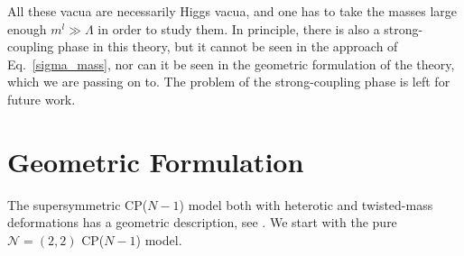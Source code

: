 \documentclass[12pt]{article}
\newcommand{\ntwot}{${\mathcal N}= \left(2,2\right) $ }
\begin{document}
	All these vacua are necessarily Higgs vacua, and one has to take the masses large enough
	$ m^l \gg \Lambda $ in order to study them.
	In principle, there is also a strong-coupling phase in this theory, but it cannot
	be seen in the approach of Eq.~\eqref{sigma_mass}, nor can it be seen in the geometric formulation
	of the theory, which we are passing on to.	
	The problem of the strong-coupling phase is left for future work.


%
%
\section{Geometric Formulation}
\label{geomf}	
	
	The supersymmetric CP($N-1$) model both with heterotic and twisted-mass deformations has
	a geometric description, see \cite{SVZw,SYhet}.
	We start with the pure \ntwot CP($N-1$) model.
\end{document}
